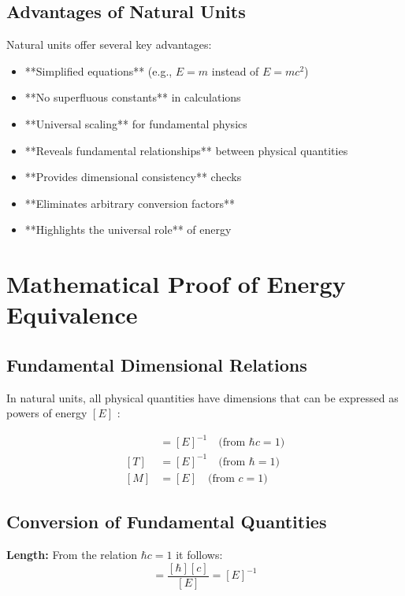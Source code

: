 \documentclass[11pt,a4paper]{article}
\begin{document}
	\subsection{Advantages of Natural Units}
	
	Natural units offer several key advantages:
	\begin{itemize}
		\item **Simplified equations** (e.g., $E = m$ instead of $E = mc^2$)
		\item **No superfluous constants** in calculations
		\item **Universal scaling** for fundamental physics
		\item **Reveals fundamental relationships** between physical quantities
		\item **Provides dimensional consistency** checks
		\item **Eliminates arbitrary conversion factors**
		\item **Highlights the universal role** of energy
	\end{itemize}
	
	\section{Mathematical Proof of Energy Equivalence}
	
	\subsection{Fundamental Dimensional Relations}
	
	In natural units, all physical quantities have dimensions that can be expressed as powers of energy $[E]$ \cite{weinberg1995,peskin1995}:
	
	\begin{align}
		[L] &= [E]^{-1} \quad \text{(from } \hbar c = 1\text{)} \\
		[T] &= [E]^{-1} \quad \text{(from } \hbar = 1\text{)} \\
		[M] &= [E] \quad \text{(from } c = 1\text{)}
	\end{align}
	
	\subsection{Conversion of Fundamental Quantities}
	
	\textbf{Length:} From the relation $\hbar c = 1$ it follows:
	\begin{equation}
		[L] = \frac{[\hbar][c]}{[E]} = [E]^{-1}
	\end{equation}
	
\end{document}
